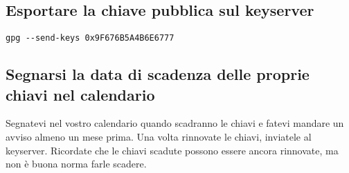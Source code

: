 \subsection{Esportare la chiave pubblica sul keyserver}

\begin{lstlisting}
gpg --send-keys 0x9F676B5A4B6E6777
\end{lstlisting}

\subsection{Segnarsi la data di scadenza delle proprie chiavi nel calendario}

Segnatevi nel vostro calendario quando scadranno le chiavi e fatevi mandare un
avviso almeno un mese prima. Una volta rinnovate le chiavi, inviatele al
keyserver. Ricordate che le chiavi scadute possono essere ancora rinnovate, ma
non è buona norma farle scadere.
